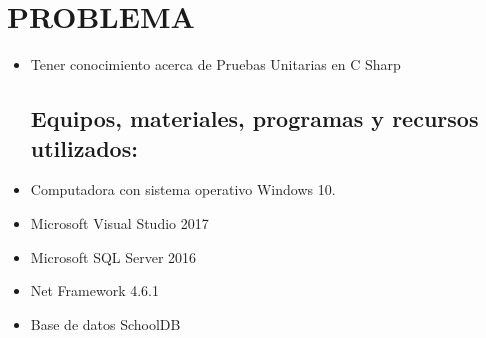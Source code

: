\section{PROBLEMA} 

\begin{itemize}
\subsection{Objetivos:}
	\item Tener conocimiento acerca de Pruebas Unitarias en C Sharp

\subsection{Equipos, materiales, programas y recursos utilizados:}
	\item Computadora con sistema operativo Windows 10.
	\item Microsoft Visual Studio 2017
	\item Microsoft SQL Server 2016
	\item Net Framework 4.6.1
	\item Base de datos SchoolDB

\end{itemize}